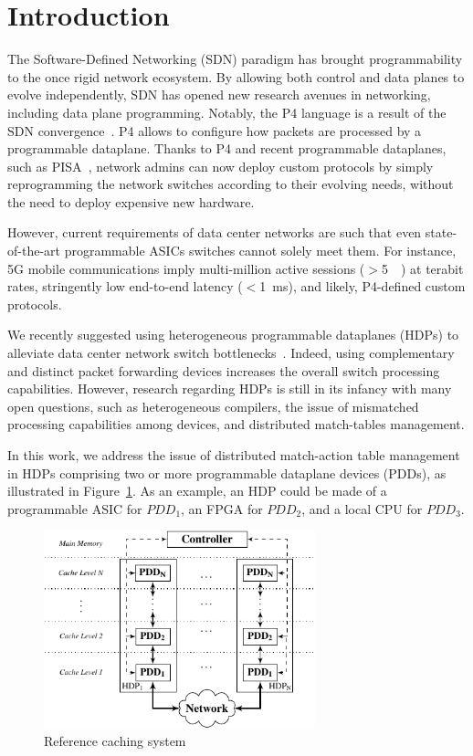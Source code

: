\section{Introduction}\label{sec:intro}

The Software-Defined Networking (SDN) paradigm has brought programmability to the once rigid network ecosystem.
By allowing both control and data planes to evolve independently, SDN has opened new research avenues in networking, including data plane programming.
Notably, the P4 language is a result of the SDN convergence~\cite{Bosshart:14}.
P4 allows to configure how packets are processed by a programmable dataplane. 
Thanks to P4 and recent programmable dataplanes, such as PISA~\cite{Bosshart:13}, network admins can now deploy custom protocols by simply reprogramming the network switches according to their evolving needs, without the need to deploy expensive new hardware. 


However, current requirements of data center networks are such that even state-of-the-art programmable ASICs switches cannot solely meet them.
For instance, 5G mobile communications imply multi-million active sessions ($>$\SI{5}{\mega\nothing}) at terabit rates, stringently low end-to-end latency ($<$\SI{1}{\milli\second}), and likely, P4-defined custom protocols.

We recently suggested using heterogeneous programmable dataplanes (HDPs) to alleviate data center network switch bottlenecks~\cite{p4eu:18}.
Indeed, using complementary and distinct packet forwarding devices increases the overall switch processing capabilities.
However, research regarding HDPs is still in its infancy with many open questions, such as heterogeneous compilers, the issue of mismatched processing capabilities among devices, and distributed match-tables management.

In this work, we address the issue of distributed match-action table management in HDPs comprising two or more programmable dataplane devices (PDDs), as illustrated in Figure~\ref{fig:high_level_network}.
As an example, an HDP could be made of a programmable ASIC for $PDD_1$, an  FPGA for $PDD_2$, and a local CPU for $PDD_3$.

\begin{figure}[]
	\centering
	\includegraphics[width=0.7\textwidth]{scheme_top.pdf}
	\caption{Reference caching system}
	\label{fig:high_level_network}
\end{figure}

